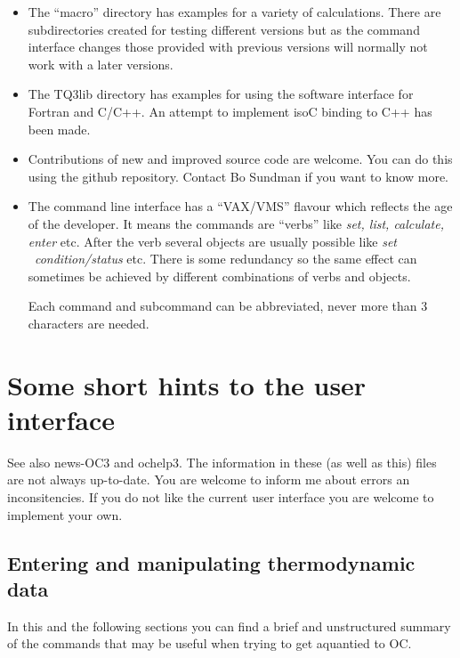 \documentclass[12pt]{article}
\begin{document}
\begin{itemize}
\item The ``macro'' directory has examples for a variety of
  calculations.  There are subdirectories created for testing
  different versions but as the command interface changes those
  provided with previous versions will normally not work with a later
  versions.

\item The TQ3lib directory has examples for using the software
  interface for Fortran and C/C++.  An attempt to implement isoC
  binding to C++ has been made.

\item Contributions of new and improved source code are welcome.  You
  can do this using the github repository.  Contact Bo Sundman if you
  want to know more.

\item The command line interface has a ``VAX/VMS'' flavour which
  reflects the age of the developer.  It means the commands are
  ``verbs'' like {\em set, list, calculate, enter} etc.  After the
  verb several objects are usually possible like {\em
    set ~condition/status} etc.  There is some redundancy so the same
  effect can sometimes be achieved by different combinations of verbs
  and objects.

  Each command and subcommand can be abbreviated, never more than 3
  characters are needed.

\end{itemize}

\section{Some short hints to the user interface}

See also news-OC3 and ochelp3.  The information in these (as well as
this) files are not always up-to-date.  You are welcome to inform me
about errors an inconsitencies.  If you do not like the current user
interface you are welcome to implement your own.

\subsection{Entering and manipulating thermodynamic data}

In this and the following sections you can find a brief and
unstructured summary of the commands that may be useful when trying to
get aquantied to OC.
\end{document}
